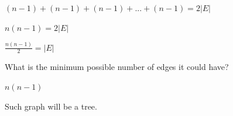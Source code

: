 \documentclass{amsart}
\theoremstyle{definition}
\theoremstyle{remark}
\numberwithin{equation}{section}
\begin{document}
\begin{enumerate}
\vspace{0.2cm}

$(n-1)+(n-1)+(n-1)+...+(n-1)=2|E|$

\vspace{0.2cm}

$n\left(n-1\right)=2|E|$

\vspace{0.2cm}

$\frac{n\left(n-1\right)}{2}=|E|$

\vspace{0.2cm}

What is the minimum possible number of edges it could have?

\vspace{0.2cm}

$n\left(n-1\right)$

\vspace{0.2cm}

Such graph will be a tree.

\end{enumerate}
\end{document}
